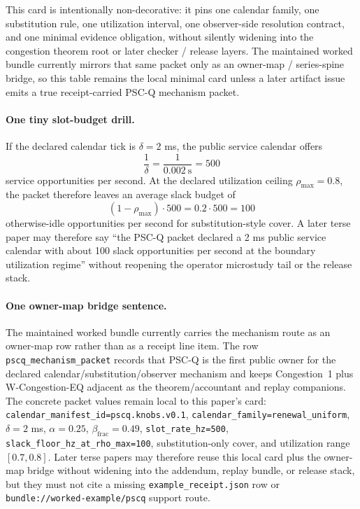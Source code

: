 \documentclass[11pt]{article}
\theoremstyle{definition}
\theoremstyle{remark}
\begin{document}
This card is intentionally non-decorative: it pins one calendar family, one substitution rule, one utilization interval, one observer-side resolution contract, and one minimal evidence obligation, without silently widening into the congestion theorem root or later checker / release layers. The maintained worked bundle currently mirrors that same packet only as an owner-map / series-spine bridge, so this table remains the local minimal card unless a later artifact issue emits a true receipt-carried PSC-Q mechanism packet.

\paragraph{One tiny slot-budget drill.}
If the declared calendar tick is $\delta=2$ ms, the public service calendar offers
\[
\frac{1}{\delta} = \frac{1}{0.002\ \mathrm{s}} = 500
\]
service opportunities per second.
At the declared utilization ceiling $\rho_{\max}=0.8$, the packet therefore leaves an average slack budget of
\[
(1-\rho_{\max})\cdot 500 = 0.2\cdot 500 = 100
\]
otherwise-idle opportunities per second for substitution-style cover.
A later terse paper may therefore say ``the PSC-Q packet declared a 2 ms public service calendar with about 100 slack opportunities per second at the boundary utilization regime'' without reopening the operator microstudy tail or the release stack.

\paragraph{One owner-map bridge sentence.}
The maintained worked bundle currently carries the mechanism route as an owner-map row rather than as a receipt line item. The row \nolinkurl{pscq\_mechanism\_packet} records that PSC-Q is the first public owner for the declared calendar/substitution/observer mechanism and keeps Congestion~1 plus W-Congestion-EQ adjacent as the theorem/accountant and replay companions. The concrete packet values remain local to this paper's card: \nolinkurl{calendar\_manifest\_id=pscq.knobs.v0.1}, \nolinkurl{calendar\_family=renewal\_uniform}, $\delta=2$ ms, $\alpha=0.25$, $\beta_{\mathrm{frac}}=0.49$, \nolinkurl{slot\_rate\_hz=500}, \nolinkurl{slack\_floor\_hz\_at\_rho\_max=100}, substitution-only cover, and utilization range $[0.7,0.8]$. Later terse papers may therefore reuse this local card plus the owner-map bridge without widening into the addendum, replay bundle, or release stack, but they must not cite a missing \nolinkurl{example\_receipt.json} row or \nolinkurl{bundle://worked-example/pscq} support route.
\end{document}
